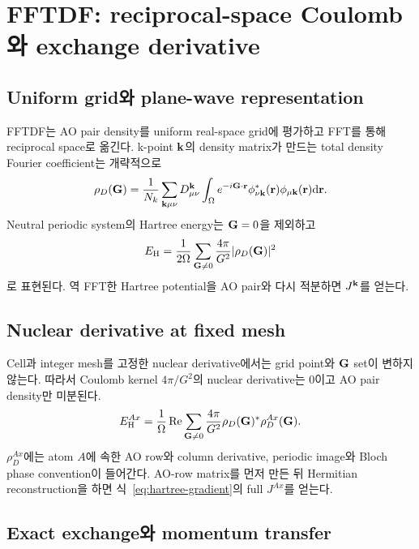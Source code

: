 \section{FFTDF: reciprocal-space Coulomb와 exchange derivative}
\label{sec:fftdf}

\subsection{Uniform grid와 plane-wave representation}

FFTDF는 AO pair density를 uniform real-space grid에 평가하고 FFT를 통해 reciprocal
space로 옮긴다. k-point $\mathbf{k}$의 density matrix가 만드는 total density Fourier
coefficient는 개략적으로
\begin{equation}
  \rho_D(\mathbf{G})
  =\frac{1}{N_k}\sum_{\mathbf{k}\mu\nu}
   D_{\mu\nu}^{\mathbf{k}}
   \int_\Omega e^{-i\mathbf{G}\cdot\mathbf r}
   \phi_{\nu\mathbf{k}}^{*}(\mathbf r)
   \phi_{\mu\mathbf{k}}(\mathbf r)\mathrm{d}\mathbf r.
  \label{eq:fftdf-density-fourier}
\end{equation}
Neutral periodic system의 Hartree energy는 $\mathbf{G}=0$을 제외하고
\begin{equation}
  E_{\mathrm H}
  =\frac{1}{2\Omega}\sum_{\mathbf{G}\ne0}
   \frac{4\pi}{G^2}|\rho_D(\mathbf{G})|^2
  \label{eq:fftdf-hartree-energy}
\end{equation}
로 표현된다. 역 FFT한 Hartree potential을 AO pair와 다시 적분하면 $J^{\mathbf{k}}$를 얻는다.

\subsection{Nuclear derivative at fixed mesh}

Cell과 integer mesh를 고정한 nuclear derivative에서는 grid point와 $\mathbf{G}$ set이 변하지
않는다. 따라서 Coulomb kernel $4\pi/G^2$의 nuclear derivative는 0이고 AO pair density만
미분된다.
\begin{equation}
  E_{\mathrm H}^{Ax}
  =\frac{1}{\Omega}\operatorname{Re}
   \sum_{\mathbf{G}\ne0}\frac{4\pi}{G^2}
   \rho_D(\mathbf{G})^*\rho_D^{Ax}(\mathbf{G}).
  \label{eq:fftdf-hartree-derivative}
\end{equation}
$\rho_D^{Ax}$에는 atom $A$에 속한 AO row와 column derivative, periodic image와 Bloch
phase convention이 들어간다. AO-row matrix를 먼저 만든 뒤 Hermitian reconstruction을
하면 식~\eqref{eq:hartree-gradient}의 full $J^{Ax}$를 얻는다.

\subsection{Exact exchange와 momentum transfer}

